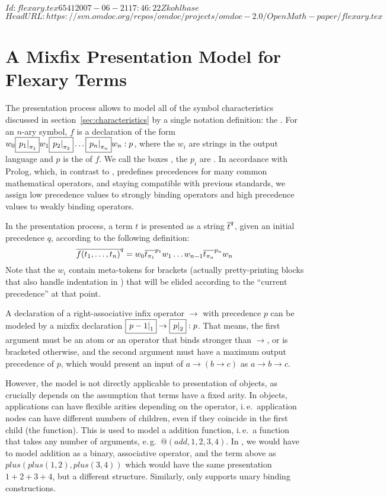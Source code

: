 \svnInfo $Id: flexary.tex 6541 2007-06-21 17:46:22Z kohlhase $
\svnKeyword $HeadURL: https://svn.omdoc.org/repos/omdoc/projects/omdoc-2.0/OpenMath-paper/flexary.tex $
\section{A Mixfix Presentation Model for Flexary Terms}\label{sec:flexary}
The {\isabelle} presentation process allows to model all of the symbol characteristics
discussed in section~\ref{sec:characteristics} by a single notation definition: the
{}. For an $n$-ary symbol, $f$ is a declaration of the form
$w_0\fbox{\ensuremath{\left.p_1\right|_{\pi_1}}}w_1\fbox{\ensuremath{\left.p_2\right|_{\pi_2}}}\ldots\fbox{\ensuremath{\left.p_n\right|_{\pi_n}}}w_n:p$, where the $w_i$
are strings in the output language and $p$ is the {} of $f$. We
call the boxes {}, the $p_i$ are {}. In accordance with Prolog, which, in contrast to {\isabelle},
predefines precedences for many common mathematical operators, and staying compatible with
previous {\omdoc} standards, we assign low precedence values to strongly binding operators
and high precedence values to weakly binding operators.

In the presentation process, a term $t$ is presented as a string
$\overline{t}^{q}$, given an initial precedence $q$, according to the following definition:
\[\overline{f(t_1,\ldots,t_n)}^{q}=w_0\overline{t_{\pi_1}}^{p_1}w_1\ldots w_{n-1}\overline{t_{\pi_n}}^{p_n}w_n\]
Note that the $w_i$ contain meta-tokens for brackets (actually pretty-printing blocks that
also handle indentation in {\isabelle}) that will be elided according to the ``current
precedence'' at that point.

A declaration of a right-associative infix operator $\to$ with precedence $p$ can be
modeled by a mixfix declaration $\fbox{\ensuremath{\left.p-1\right|_{1}}}\to\fbox{\ensuremath{\left.p\right|_{2}}}:p$. That means, the first
argument must be an atom or an operator that binds stronger than $\to$, or is bracketed
otherwise, and the second argument must have a maximum output precedence of $p$, which
would present an input of $a\to (b\to c)$ as $a\to b\to c$.

However, the {\isabelle} model is not directly applicable to presentation of {\openmath}
objects, as {\isabelle} crucially depends on the assumption that terms have a fixed arity.
In {\openmath} objects, applications can have flexible arities depending on the operator,
i.\,e.\ application nodes can have different numbers of children, even if they coincide in
the first child (the function). This is used to model a {} addition
function, i.\,e.\ a function that takes any number of arguments, e.\,g.\ $@(add,1,2,3,4)$.
In {\isabelle}, we would have to model addition as a binary, associative operator, and the
term above as $plus(plus(1,2),plus(3,4))$ which would have the same presentation
$1+2+3+4$, but a different structure. Similarly, {\isabelle} only supports unary binding
constructions.

